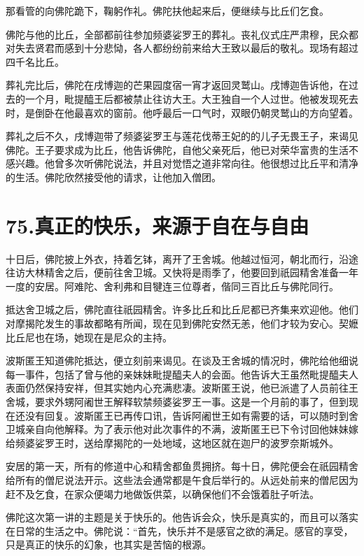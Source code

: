 \documentclass[12pt,twoside,openany]{book}
\begin{document}
那看管的向佛陀跪下，鞠躬作礼。佛陀扶他起来后，便继续与比丘们乞食。

佛陀与他的比丘，全部都前往参加频婆娑罗王的葬礼。丧礼仪式庄严肃穆，民众都对失去贤君而感到十分悲恸，各人都纷纷前来给大王致以最后的敬礼。现场有超过四千名比丘。

葬礼完比后，佛陀在戌博迦的芒果园度宿一宵才返回灵鹫山。戌博迦告诉他，在过去的一个月，毗提醯王后都被禁止往访大王。大王独自一个人过世。他被发现死去时，是倒卧在他最喜欢的窗前。他呼最后一口气时，双眼仍朝灵鹫山的方向望着。

葬礼之后不久，戌博迦带了频婆娑罗王与莲花伐蒂王妃的的儿子无畏王子，来谒见佛陀。王子要求成为比丘，他告诉佛陀，自他父亲死后，他已对荣华富贵的生活不感兴趣。他曾多次听佛陀说法，并且对觉悟之道非常向往。他很想过比丘平和清净的生活。佛陀欣然接受他的请求，让他加入僧团。


\chapter{75.真正的快乐，来源于自在与自由}\label{ch75}

十日后，佛陀披上外衣，持着乞钵，离开了王舍城。他越过恒河，朝北而行，沿途往访大林精舍之后，便前往舍卫城。又快将是雨季了，他要回到祇园精舍准备一年一度的安居。阿难陀、舍利弗和目犍连三位尊者，偕同三百比丘与佛陀同行。

抵达舍卫城之后，佛陀直往祇园精舍。许多比丘和比丘尼都已齐集来欢迎他。他们对摩揭陀发生的事故都略有所闻，现在见到佛陀安然无恙，他们才较为安心。契嬷比丘尼也在场，她现在是尼众的主持。

波斯匿王知道佛陀抵达，便立刻前来谒见。在谈及王舍城的情况时，佛陀给他细说每一事件，包括了曾与他的亲妹妹毗提醯夫人的会面。他告诉大王虽然毗提醯夫人表面仍然保持安祥，但其实她内心充满悲凄。波斯匿王说，他已派遣了人员前往王舍城，要求外甥阿阇世王解释软禁频婆娑罗王一事。这是一个月前的事了，但到现在还没有回复。波斯匿王已再传口讯，告诉阿阇世王如有需要的话，可以随时到舍卫城亲自向他解释。为了表示他对此次事件的不满，波斯匿王已下令讨回他妹妹嫁给频婆娑罗王时，送给摩揭陀的一处地域，这地区就在迦尸的波罗奈斯城外。

安居的第一天，所有的修道中心和精舍都鱼贯拥挤。每十日，佛陀便会在祇园精舍给所有的僧尼说法开示。这些法会通常都是午食后举行的。从远处前来的僧尼因为赶不及乞食，在家众便竭力地做饭供菜，以确保他们不会饿着肚子听法。

佛陀这次第一讲的主题是关于快乐的。他告诉会众，快乐是真实的，而且可以落实在日常的生活之中。佛陀说：“首先，快乐并不是感官之欲的满足。感官的享受，只是真正的快乐的幻象，也其实是苦恼的根源。
\end{document}
